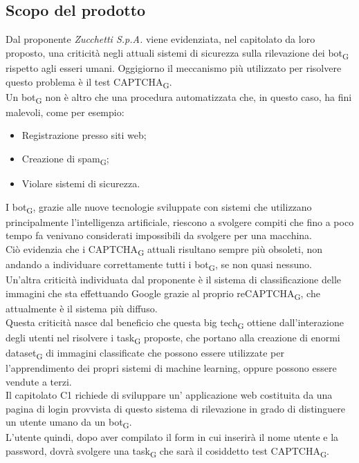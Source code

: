 \subsection{Scopo del prodotto}
Dal proponente \textit{Zucchetti S.p.A.} viene evidenziata, nel capitolato da loro proposto, una criticità negli attuali sistemi di sicurezza sulla rilevazione dei bot\textsubscript{G} rispetto agli esseri umani. Oggigiorno il meccanismo più utilizzato per risolvere questo problema è il test CAPTCHA\textsubscript{G}.\\
Un bot\textsubscript{G} non è altro che una procedura automatizzata che, in questo caso, ha fini malevoli, come per esempio:
\begin{itemize}
	\item Registrazione presso siti web;
	\item Creazione di spam\textsubscript{G};
	\item Violare sistemi di sicurezza.
\end{itemize}
I bot\textsubscript{G}, grazie alle nuove tecnologie sviluppate con sistemi che utilizzano principalmente l'intelligenza artificiale, riescono a svolgere compiti che fino a poco tempo fa venivano considerati impossibili da svolgere per una macchina.\\
Ciò evidenzia che i CAPTCHA\textsubscript{G} attuali risultano sempre più obsoleti, non andando a individuare correttamente tutti i bot\textsubscript{G}, se non quasi nessuno.\\
Un'altra criticità individuata dal proponente è il sistema di classificazione delle immagini che sta effettuando Google grazie al proprio reCAPTCHA\textsubscript{G}, che attualmente è il sistema più diffuso.\\
Questa criticità nasce dal beneficio che questa big tech\textsubscript{G} ottiene dall'interazione degli utenti nel risolvere i task\textsubscript{G} proposte, che portano alla creazione di enormi dataset\textsubscript{G} di immagini classificate che possono essere utilizzate per l'apprendimento dei propri sistemi di machine learning, oppure possono essere vendute a terzi.\\
Il capitolato C1 richiede di sviluppare un' applicazione web costituita da una pagina di login provvista di questo sistema di rilevazione in grado di distinguere un utente umano da un bot\textsubscript{G}.\\
L'utente quindi, dopo aver compilato il form in cui inserirà il nome utente e la password, dovrà svolgere una task\textsubscript{G} che sarà il cosiddetto test CAPTCHA\textsubscript{G}.



